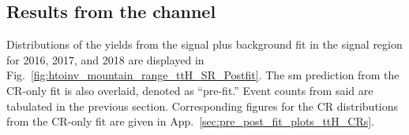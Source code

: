

\subsection{Results from the \texorpdfstring{\ttH}{ttH} channel}
\label{subsec:htoinv_results_ttH}

Distributions of the yields from the signal plus background fit in the signal region for 2016, 2017, and 2018 are displayed in Fig.~\ref{fig:htoinv_mountain_range_ttH_SR_Postfit}. The \acrshort{sm} prediction from the \gls{CR}-only fit is also overlaid, denoted as ``pre-fit.'' Event counts from said are tabulated in the previous section. Corresponding figures for the \gls{CR} distributions from the \gls{CR}-only fit are given in App.~\ref{sec:pre_post_fit_plots_ttH_CRs}.

